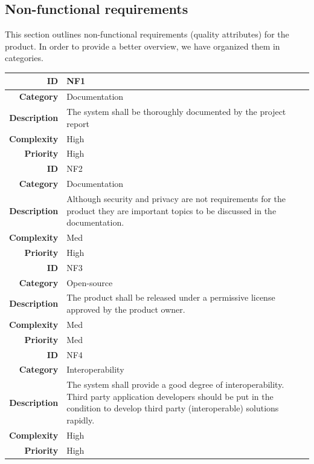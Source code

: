 \newpage
\subsection{Non-functional requirements}
\label{section:nonfunctionalreq}

This section outlines non-functional requirements (quality attributes) for the product.
In order to provide a better overview, we have organized them in categories.

\begin{table}[h]
\begin{center}
\begin{tabular}{ | r | p{11.5cm} | }
  \hline
  
  \textbf{ID} & NF1 \\
  \hline\noalign{\smallskip}\hline
  \textbf{Category}			&	Documentation\\
  \textbf{Description}	& The system shall be thoroughly documented by the project report \\
  \textbf{Complexity}		& High \\
  \textbf{Priority}			& High \\
  \hline\noalign{\smallskip}\noalign{\smallskip}\hline

  \textbf{ID} & NF2 \\
  \hline\noalign{\smallskip}\hline
  \textbf{Category}			&	Documentation\\
  \textbf{Description}	& Although security and privacy are not requirements for the product they
													are important topics to be discussed in the documentation. \\
  \textbf{Complexity}		& Med \\
  \textbf{Priority}			& High \\
  \hline\noalign{\smallskip}\noalign{\smallskip}\hline

  \textbf{ID} & NF3 \\
  \hline\noalign{\smallskip}\hline
  \textbf{Category}			&	Open-source\\
  \textbf{Description}	& The product shall be released under a permissive license approved by the product owner. \\
  \textbf{Complexity}		& Med \\
  \textbf{Priority}			& Med \\
  \hline\noalign{\smallskip}\noalign{\smallskip}\hline
  
  \textbf{ID} & NF4 \\
  \hline\noalign{\smallskip}\hline
  \textbf{Category}			&	Interoperability \\
  \textbf{Description}	& The system shall provide a good degree of interoperability.
  												Third party application developers should be put in the condition to develop
  												third party (interoperable) solutions rapidly. \\
  \textbf{Complexity}		& High \\
  \textbf{Priority}			& High \\


\end{tabular}
\end{center}
\end{table}
